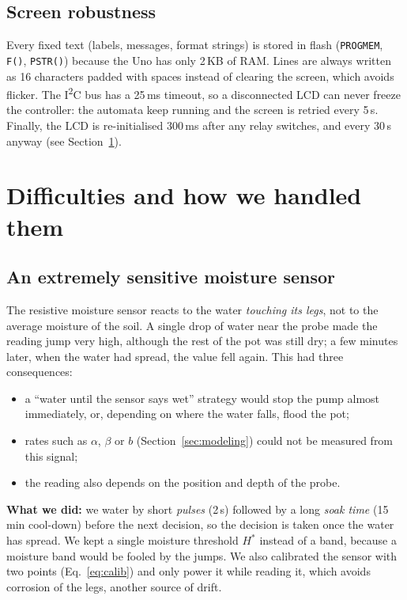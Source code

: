 \documentclass[10pt,a4paper,twocolumn]{article}
\newcommand{\code}[1]{\texttt{#1}}
\begin{document}
\subsection{Screen robustness}
Every fixed text (labels, messages, format strings) is stored in flash
(\code{PROGMEM}, \code{F()}, \code{PSTR()}) because the Uno has only 2\,KB of RAM.
Lines are always written as 16 characters padded with spaces instead of clearing the
screen, which avoids flicker. The I\textsuperscript{2}C bus has a 25\,ms timeout, so a
disconnected LCD can never freeze the controller: the automata keep running and the
screen is retried every 5\,s. Finally, the LCD is re-initialised 300\,ms after any
relay switches, and every 30\,s anyway (see Section~\ref{sec:difficulties}).

\section{Difficulties and how we handled them}\label{sec:difficulties}

\subsection{An extremely sensitive moisture sensor}
The resistive moisture sensor reacts to the water \emph{touching its legs}, not to
the average moisture of the soil. A single drop of water near the probe made the
reading jump very high, although the rest of the pot was still dry; a few minutes
later, when the water had spread, the value fell again. This had three consequences:
\begin{itemize}
  \item a ``water until the sensor says wet'' strategy would stop the pump almost
        immediately, or, depending on where the water falls, flood the pot;
  \item rates such as $\alpha$, $\beta$ or $b$ (Section~\ref{sec:modeling}) could not
        be measured from this signal;
  \item the reading also depends on the position and depth of the probe.
\end{itemize}
\textbf{What we did:} we water by short \emph{pulses} (2\,s) followed by a long
\emph{soak time} (15\,min cool-down) before the next decision, so the decision is
taken once the water has spread. We kept a single moisture threshold $H^*$ instead of
a band, because a moisture band would be fooled by the jumps. We also calibrated the
sensor with two points (Eq.~\ref{eq:calib}) and only power it while reading it,
which avoids corrosion of the legs, another source of drift.
\end{document}
